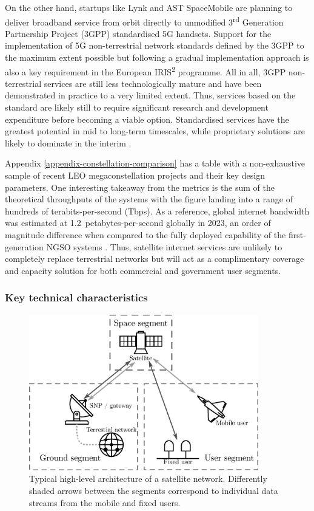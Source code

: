 \documentclass[english, 12pt, a4paper, elec, utf8, a-1b, online]{aaltothesis}
\begin{document}
On the other hand, startups like Lynk and AST SpaceMobile are planning to deliver broadband service from orbit directly to unmodified 3\textsuperscript{rd} Generation Partnership Project (3GPP) standardised 5G handsets.
Support for the implementation of 5G non-terrestrial network standards defined by the 3GPP to the maximum extent possible but following a gradual implementation approach is also a key requirement in the European IRIS\textsuperscript{2} programme.
All in all, 3GPP non-terrestrial services are still less technologically mature and have been demonstrated in practice to a very limited extent.
Thus, services based on the standard are likely still to require significant research and development expenditure before becoming a viable option.
Standardised services have the greatest potential in mid to long-term timescales, while proprietary solutions are likely to dominate in the interim \cite{iris2-industryday-2023-03, nsr-5g-via-satellite-2023, nsr-direct-to-device-market-2023}.

Appendix \ref{appendix-constellation-comparison} has a table with a non-exhaustive sample of recent LEO megaconstellation projects and their key design parameters.
One interesting takeaway from the metrics is the sum of the theoretical throughputs of the systems with the figure landing into a range of hundreds of terabits-per-second (Tbps).
As a reference, global internet bandwidth was estimated at 1.2~petabytes-per-second globally in 2023, an order of magnitude difference when compared to the fully deployed capability of the first-generation NGSO systems \cite{telegeography-ip-networks-2023}.
Thus, satellite internet services are unlikely to completely replace terrestrial networks but will act as a complimentary coverage and capacity solution for both commercial and government user segments.

\subsubsection{Key technical characteristics} \label{ch-constellation-characteristics}

\begin{figure}[h]
  \centering
  \includegraphics[width=100mm]{figures/fig-constellation-segments.eps}
  \caption{Typical high-level architecture of a satellite network. Differently shaded arrows between the segments correspond to individual data streams from the mobile and fixed users.}
  \label{fig-constellation-segments}
\end{figure}
\end{document}
